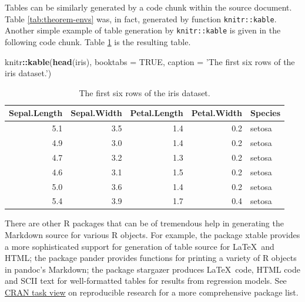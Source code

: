 \documentclass[11pt,letterpaper,]{article}
\newenvironment{Shaded}{\begin{snugshade}}{\end{snugshade}}
\newcommand{\DataTypeTok}[1]{\textcolor[rgb]{0.13,0.29,0.53}{#1}}
\newcommand{\KeywordTok}[1]{\textcolor[rgb]{0.13,0.29,0.53}{\textbf{#1}}}
\newcommand{\NormalTok}[1]{#1}
\newcommand{\OperatorTok}[1]{\textcolor[rgb]{0.81,0.36,0.00}{\textbf{#1}}}
\newcommand{\OtherTok}[1]{\textcolor[rgb]{0.56,0.35,0.01}{#1}}
\newcommand{\StringTok}[1]{\textcolor[rgb]{0.31,0.60,0.02}{#1}}
\newcommand{\pkg}[1]{{\normalfont\fontseries{b}\selectfont #1}}
\let\proglang=\textsf
\theoremstyle{definition}
\theoremstyle{definition}
\theoremstyle{definition}
\theoremstyle{remark}
\begin{document}
Tables can be similarly generated by a code chunk within the source
document. Table \ref{tab:theorem-envs} was, in fact, generated by
function \texttt{knitr::kable}. Another simple example of table
generation by \texttt{knitr::kable} is given in the following code
chunk. Table \ref{tab:iris} is the resulting table.



\begin{Shaded}
\begin{Highlighting}[]
\NormalTok{knitr}\OperatorTok{::}\KeywordTok{kable}\NormalTok{(}\KeywordTok{head}\NormalTok{(iris), }\DataTypeTok{booktabs =} \OtherTok{TRUE}\NormalTok{,}
             \DataTypeTok{caption =} \StringTok{'The first six rows of the iris dataset.'}\NormalTok{)}
\end{Highlighting}
\end{Shaded}

\begin{table}

\caption{\label{tab:iris}The first six rows of the iris dataset.}
\centering
\begin{tabular}[t]{rrrrl}
\toprule
Sepal.Length & Sepal.Width & Petal.Length & Petal.Width & Species\\
\midrule
5.1 & 3.5 & 1.4 & 0.2 & setosa\\
4.9 & 3.0 & 1.4 & 0.2 & setosa\\
4.7 & 3.2 & 1.3 & 0.2 & setosa\\
4.6 & 3.1 & 1.5 & 0.2 & setosa\\
5.0 & 3.6 & 1.4 & 0.2 & setosa\\
5.4 & 3.9 & 1.7 & 0.4 & setosa\\
\bottomrule
\end{tabular}
\end{table}

There are other \proglang{R} packages that can be of tremendous help in
generating the \proglang{Markdown} source for various \proglang{R}
objects. For example, the package \pkg{xtable} \citep{dahl2016xtable}
provides a more sophisticated support for generation of table source for
\LaTeX~and HTML; the package \pkg{pander} \citep{daroczi2015pander}
provides functions for printing a variety of \proglang{R} objects in
\pkg{pandoc}'s \proglang{Markdown}; the package \pkg{stargazer}
\citep{hlavac2015stargazer} produces \LaTeX~code, HTML code and SCII
text for well-formatted tables for results from regression models. See
\href{https://cran.r-project.org/web/views/ReproducibleResearch.html}{CRAN
task view} on reproducible research for a more comprehensive package
list.
\end{document}

